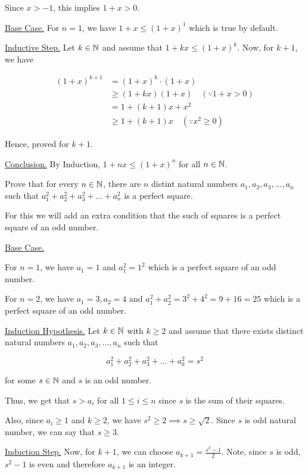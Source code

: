 \bs
Since $x > -1$, this implies $1 + x > 0$.

\underline{Base Case.} For $n = 1$, we have $1 + x \leq (1 + x)^1$ which is true by default.

\underline{Inductive Step.} Let $k \in \mathbb{N}$ and assume that $1+kx \leq (1+x)^k$. Now, for $k+1$, we have

\begin{align*}
	(1+x)^{k+1} &= (1+x)^k \cdot (1+x) \\
							&\geq (1+kx)(1+x) \quad ( \because 1+x > 0 ) \\
							&= 1+(k+1)x + x^2 \\
							&\geq 1+(k+1)x \quad ( \because x^2 \geq 0 )
\end{align*}

Hence, proved for $k+1$.

\underline{Conclusion.} By Induction, $1+nx \leq (1+x)^n$ for all $n \in \mathbb{N}$.

\es

\bp Prove that for every $n \in \mathbb{N}$, there are $n$ distint natural numbers $a_1, a_2, a_3, \ldots, a_n$ such that $a_1^2 + a_2^2 + a_3^2 + \ldots + a_n^2$ is a perfect square.
\ep

\bs

For this we will add an extra condition that the such of squares is a perfect square of an odd number.

\underline{Base Case.}

For $n = 1$, we have $a_1 = 1$ and $a_1^2 = 1^2$ which is a perfect square of an odd number.

For $n = 2$, we have $a_1 = 3, a_2 = 4$ and $a_1^2 + a_2^2 = 3^2 + 4^2 = 9 + 16 = 25$ which is a perfect square of an odd number.

\underline{Induction Hypothesis.} Let $k \in \mathbb{N}$ with $k \geq 2$ and assume that there exists distinct natural numbers $a_1, a_2, a_3, \ldots, a_n$ such that

$$a_1^2 + a_2^2 + a_3^2 + \ldots + a_k^2 = s^2$$

for some $s \in \mathbb{N}$ and $s$ is an odd number.

Thus, we get that $s > a_i$ for all $1 \leq i \leq n$ since $s$ is the sum of their squares.

Also, since $a_i \geq 1$ and $k \geq 2$, we have $s^2 \geq 2 \implies s \geq \sqrt{2}$. 
Since $s$ is odd natural number, we can say that $s \geq 3$.

\underline{Induction Step.} Now, for $k+1$, we can choose $\displaystyle a_{k+1} = \frac{s^2-1}{2}$. Note, since $s$ is odd, $s^2 - 1$ is even and therefore $a_{k+1}$ is an integer.

